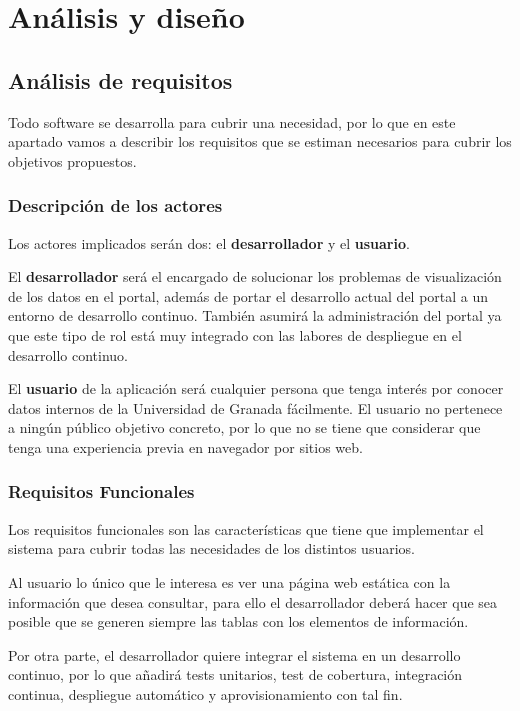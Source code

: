 \chapter{Análisis y diseño}

\section{Análisis de requisitos}

Todo software se desarrolla para cubrir una necesidad, por lo que en este apartado vamos a describir los requisitos que se 
estiman necesarios para cubrir los objetivos propuestos.

\subsection{Descripción de los actores}

Los actores implicados serán dos: el \textbf{desarrollador} y el \textbf{usuario}.

\bigskip
El \textbf{desarrollador} será el encargado de solucionar los problemas de visualización de los datos en el portal, además de 
portar el desarrollo actual del portal a un entorno de desarrollo continuo. También asumirá la administración del portal ya que
este tipo de rol está muy integrado con las labores de despliegue en el desarrollo continuo.

\bigskip
El \textbf{usuario} de la aplicación será cualquier persona que tenga interés por conocer datos internos de la Universidad de Granada 
fácilmente. El usuario no pertenece a ningún público objetivo concreto, por lo que no se tiene que considerar que tenga una
experiencia previa en navegador por sitios web.

\subsection{Requisitos Funcionales}

Los requisitos funcionales son las características que tiene que implementar el sistema para cubrir todas las necesidades de 
los distintos usuarios.

\bigskip
Al usuario lo único que le interesa es ver una página web estática con la información que desea 
consultar, para ello el desarrollador deberá hacer que sea posible que se generen siempre las tablas con los elementos de 
información. 

\bigskip
Por otra parte, el desarrollador quiere integrar el sistema en un desarrollo continuo, por lo que añadirá tests 
unitarios, test de cobertura, integración continua, despliegue automático y aprovisionamiento con tal fin.

